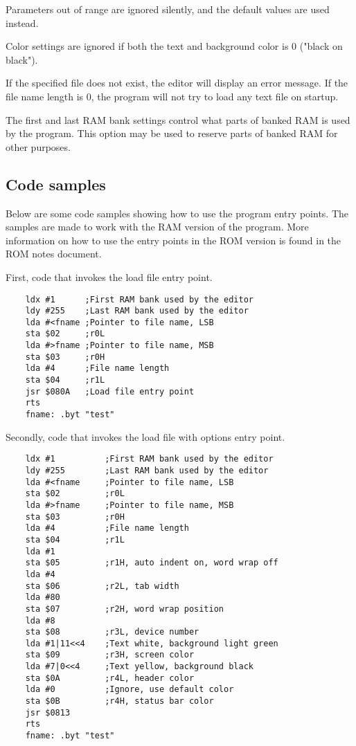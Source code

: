 \documentclass{article}
\begin{document}
        \noindent Parameters out of range are ignored silently, and the default
        values are used instead.

        Color settings are ignored if both the text and background color is 0
        ("black on black").

        If the specified file does not exist, the editor will display an
        error message. If the file name length is 0, the program will not try
        to load any text file on startup.

        The first and last RAM bank settings control what parts of banked RAM is
        used by the program. This option may be used to reserve parts of banked RAM
        for other purposes.

    \subsection{Code samples}

        Below are some code samples showing how to use the program entry points. The
        samples are made to work with the RAM version of the program. More information
        on how to use the entry points in the ROM version is found in the ROM notes
        document.

        First, code that invokes the load file entry point.

\begin{verbatim}
    ldx #1      ;First RAM bank used by the editor
    ldy #255    ;Last RAM bank used by the editor
    lda #<fname ;Pointer to file name, LSB
    sta $02     ;r0L
    lda #>fname ;Pointer to file name, MSB
    sta $03     ;r0H
    lda #4      ;File name length
    sta $04     ;r1L
    jsr $080A   ;Load file entry point
    rts
    fname: .byt "test"
\end{verbatim}

        Secondly, code that invokes the load file with options entry point.

\begin{verbatim}
    ldx #1          ;First RAM bank used by the editor
    ldy #255        ;Last RAM bank used by the editor
    lda #<fname     ;Pointer to file name, LSB
    sta $02         ;r0L
    lda #>fname     ;Pointer to file name, MSB
    sta $03         ;r0H
    lda #4          ;File name length
    sta $04         ;r1L
    lda #1
    sta $05         ;r1H, auto indent on, word wrap off
    lda #4
    sta $06         ;r2L, tab width
    lda #80
    sta $07         ;r2H, word wrap position
    lda #8
    sta $08         ;r3L, device number
    lda #1|11<<4    ;Text white, background light green
    sta $09         ;r3H, screen color
    lda #7|0<<4     ;Text yellow, background black
    sta $0A         ;r4L, header color
    lda #0          ;Ignore, use default color
    sta $0B         ;r4H, status bar color
    jsr $0813
    rts
    fname: .byt "test"
\end{verbatim}
\end{document}
